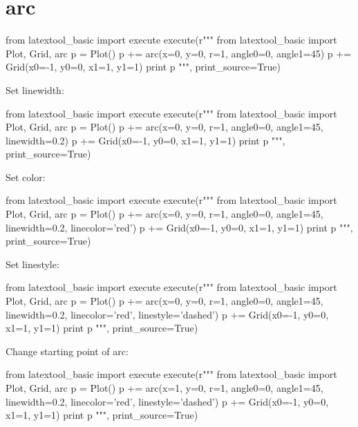 \section{arc}

\begin{python}
from latextool_basic import execute
execute(r"""
from latextool_basic import Plot, Grid, arc
p = Plot()
p += arc(x=0, y=0, r=1, angle0=0, angle1=45)
p += Grid(x0=-1, y0=0, x1=1, y1=1)
print p
""", print_source=True)
\end{python}



Set linewidth:
\begin{python}
from latextool_basic import execute
execute(r"""
from latextool_basic import Plot, Grid, arc
p = Plot()
p += arc(x=0, y=0, r=1, angle0=0, angle1=45, linewidth=0.2)
p += Grid(x0=-1, y0=0, x1=1, y1=1)
print p
""", print_source=True)
\end{python}




\begin{samepage}
Set color:
\begin{python}
from latextool_basic import execute
execute(r"""
from latextool_basic import Plot, Grid, arc
p = Plot()
p += arc(x=0, y=0, r=1, angle0=0, angle1=45, 
         linewidth=0.2, linecolor='red')
p += Grid(x0=-1, y0=0, x1=1, y1=1)
print p
""", print_source=True)
\end{python}
\end{samepage}



\begin{samepage}
Set linestyle:
\begin{python}
from latextool_basic import execute
execute(r"""
from latextool_basic import Plot, Grid, arc
p = Plot()
p += arc(x=0, y=0, r=1, angle0=0, angle1=45, 
        linewidth=0.2, linecolor='red', linestyle='dashed')
p += Grid(x0=-1, y0=0, x1=1, y1=1)
print p
""", print_source=True)
\end{python}
\end{samepage}




\begin{samepage}
Change starting point of arc:
\begin{python}
from latextool_basic import execute
execute(r"""
from latextool_basic import Plot, Grid, arc
p = Plot()
p += arc(x=1, y=0, r=1, angle0=0, angle1=45, 
        linewidth=0.2, linecolor='red', linestyle='dashed')
p += Grid(x0=-1, y0=0, x1=1, y1=1)
print p
""", print_source=True)
\end{python}
\end{samepage}
